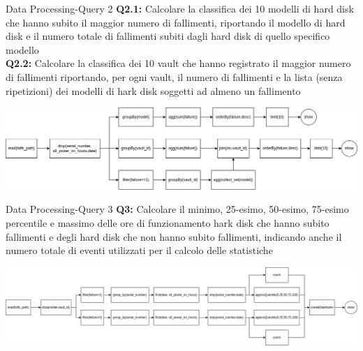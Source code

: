 \documentclass[13pt,aspectratio=169,t,xcolor=table]{beamer}
\begin{document}
\begin{frame}{Data Processing-Query 2}
    \textbf{Q2.1:} 
    Calcolare la classifica dei 10 modelli di hard disk che hanno subito il maggior numero di fallimenti, riportando il modello di hard disk e il numero totale di fallimenti subiti dagli hard disk di quello specifico modello\\ 
    \vspace{0.2cm}
    \textbf{Q2.2:} 
    Calcolare la classifica dei 10 vault che hanno registrato il maggior numero di fallimenti riportando, per ogni vault, il numero di fallimenti e la lista (senza ripetizioni) dei modelli di hark disk soggetti ad almeno un fallimento
    \begin{adjustbox}{margin=0cm 0cm 0cm 0.5cm, center}
        \includegraphics[width=1\textwidth]{res/query2_dag.png}
    \end{adjustbox}
\end{frame}

\begin{frame}{Data Processing-Query 3}
    \textbf{Q3:} Calcolare il minimo, 25-esimo, 50-esimo, 75-esimo percentile e massimo delle ore di funzionamento hark disk che hanno subito fallimenti e degli hard disk che non hanno subito fallimenti, indicando anche il numero totale di eventi utilizzati per il calcolo delle statistiche
    \begin{adjustbox}{margin=0cm 0cm 0cm 0.5cm, center}
        \includegraphics[width=1\textwidth]{res/query3_dag.png}
    \end{adjustbox}
\end{frame}
\end{document}
